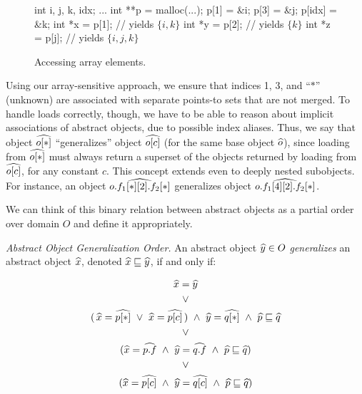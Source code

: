 \begin{figure}[ht]
\begin{cppcode}
int i, j, k, idx;
...
int **p = malloc(...);
p[1] = &i;
p[3] = &j;
p[idx] = &k;
int *x = p[1];  // yields $\{ i, k \}$
int *y = p[2];  // yields $\{ k \}$
int *z = p[j];  // yields $\{ i, j, k \}$
\end{cppcode}
  \caption{Accessing array elements.}
  \label{structsens/fig/array}
\end{figure}

Using our array-sensitive approach, we ensure that indices 1, 3, and
``$*$'' (unknown) are associated with separate points-to sets that are
not merged. To handle loads correctly, though, we have to be able to
reason about implicit associations of abstract objects, due to
possible index aliases. Thus, we say that object
$\widehat{o[*]}$ ``generalizes'' object $\widehat{o[c]}$ (for the same
base object $\widehat{o}$), since loading from $\widehat{o[*]}$ must
always return a superset of the objects returned by loading from
$\widehat{o[c]}$, for any constant $c$. This concept extends even to
deeply nested subobjects. For instance, an object 
$\widehat{o.f_1[*][2].f_2[*]}$ generalizes object
$\widehat{o.f_1[4][2].f_2[*]}$.

We can think of this binary relation between abstract objects as a
partial order over domain $O$ and define it appropriately.

\begin{defn}{\emph{Abstract Object Generalization Order.}}
  An abstract object $\widehat{y} \in O$ \emph{generalizes} an abstract
  object $\widehat{x}$, denoted $\widehat{x} \sqsubseteq \widehat{y}$, if
  and only if:

\begin{gather*}
  \widehat{x} = \widehat{y}
  \\
  \lor
  \\
  (\, \widehat{x} = \widehat{p[*]}\ \lor\ \widehat{x} = \widehat{p[c]} \,)\
  \land\ \widehat{y} = \widehat{q[*]}\
  \land\ \widehat{p} \sqsubseteq \widehat{q}
  \\
  \lor
  \\
  (\widehat{x} = \widehat{p.f}\
  \land\ \widehat{y} = \widehat{q.f}\
  \land\ \widehat{p} \sqsubseteq \widehat{q})
  \\
  \lor
  \\
  (\widehat{x} = \widehat{p[c]}\
  \land\ \widehat{y} = \widehat{q[c]}\
  \land\ \widehat{p} \sqsubseteq \widehat{q})
\end{gather*}
\end{defn}

